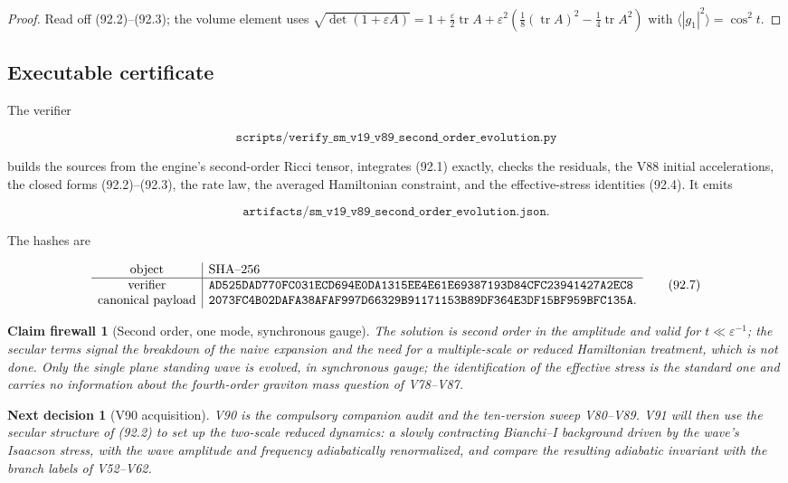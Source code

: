 \documentclass[11pt]{article}
\newtheorem{firewall}[theorem]{Claim firewall}
\newtheorem{decision}[theorem]{Next decision}
\theoremstyle{remark}
\begin{document}
\begin{proof}
Read off (92.2)--(92.3); the volume element uses
\(\sqrt{\det(1+\varepsilon A)}=1+\tfrac\varepsilon2\operatorname{tr}A+\varepsilon^2(\tfrac18(\operatorname{tr}A)^2-\tfrac14\operatorname{tr}A^2)\)
with \(\langle|g_1|^2\rangle=\cos^2t\).
\end{proof}

\subsection{Executable certificate}

The verifier

\[
 \texttt{scripts/verify\_sm\_v19\_v89\_second\_order\_evolution.py}
                                                                    \tag{92.5}
\]

builds the sources from the engine's second-order Ricci tensor,
integrates (92.1) exactly, checks the residuals, the V88 initial
accelerations, the closed forms (92.2)--(92.3), the rate law, the
averaged Hamiltonian constraint, and the effective-stress identities
(92.4).  It emits

\[
 \texttt{artifacts/sm\_v19\_v89\_second\_order\_evolution.json}.     \tag{92.6}
\]

The hashes are

\[
\begin{array}{c|l}
\hbox{object}&\hbox{SHA--256}\\ \hline
\hbox{verifier}&
\texttt{AD525DAD770FC031ECD694E0DA1315EE4E61E69387193D84CFC23941427A2EC8}\\
\hbox{canonical payload}&
\texttt{2073FC4B02DAFA38AFAF997D66329B91171153B89DF364E3DF15BF959BFC135A}.
\end{array}                                                     \tag{92.7}
\]

\begin{firewall}[Second order, one mode, synchronous gauge]
\label{fire:v19v89}
The solution is second order in the amplitude and valid for
\(t\ll\varepsilon^{-1}\); the secular terms signal the breakdown of
the naive expansion and the need for a multiple-scale or reduced
Hamiltonian treatment, which is not done.  Only the single plane
standing wave is evolved, in synchronous gauge; the identification of
the effective stress is the standard one and carries no information
about the fourth-order graviton mass question of V78--V87.
\end{firewall}

\begin{decision}[V90 acquisition]
\label{dec:v19v89-next}
V90 is the compulsory companion audit and the ten-version sweep
V80--V89.  V91 will then use the secular structure of (92.2) to set
up the two-scale reduced dynamics: a slowly contracting Bianchi--I
background driven by the wave's Isaacson stress, with the wave
amplitude and frequency adiabatically renormalized, and compare the
resulting adiabatic invariant with the branch labels of V52--V62.
\end{decision}
\end{document}
